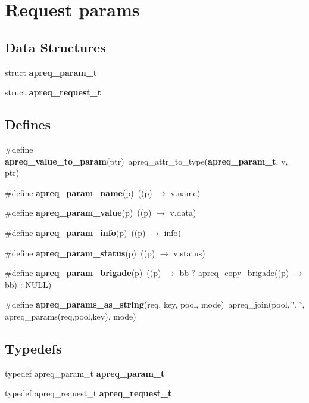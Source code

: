 \section{Request params}
\label{group__params}
\subsection*{Data Structures}
\begin{CompactItemize}
\item 
struct {\bf apreq\_\-param\_\-t}
\item 
struct {\bf apreq\_\-request\_\-t}
\end{CompactItemize}
\subsection*{Defines}
\begin{CompactItemize}
\item 
\#define {\bf apreq\_\-value\_\-to\_\-param}(ptr)\ apreq\_\-attr\_\-to\_\-type({\bf apreq\_\-param\_\-t}, v, ptr)
\item 
\#define {\bf apreq\_\-param\_\-name}(p)\ ((p) $\rightarrow$ v.name)\label{group__params_a14}

\item 
\#define {\bf apreq\_\-param\_\-value}(p)\ ((p) $\rightarrow$ v.data)\label{group__params_a15}

\item 
\#define {\bf apreq\_\-param\_\-info}(p)\ ((p) $\rightarrow$ info)\label{group__params_a16}

\item 
\#define {\bf apreq\_\-param\_\-status}(p)\ ((p) $\rightarrow$ v.status)\label{group__params_a17}

\item 
\#define {\bf apreq\_\-param\_\-brigade}(p)\ ((p) $\rightarrow$ bb ? apreq\_\-copy\_\-brigade((p) $\rightarrow$ bb) : NULL)\label{group__params_a18}

\item 
\#define {\bf apreq\_\-params\_\-as\_\-string}(req, key, pool, mode)\ apreq\_\-join(pool, \char`\"{}, \char`\"{}, apreq\_\-params(req,pool,key), mode)
\end{CompactItemize}
\subsection*{Typedefs}
\begin{CompactItemize}
\item 
typedef apreq\_\-param\_\-t {\bf apreq\_\-param\_\-t}
\item 
typedef apreq\_\-request\_\-t {\bf apreq\_\-request\_\-t}
\end{CompactItemize}
